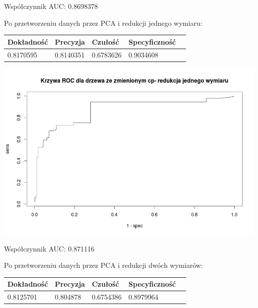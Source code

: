\documentclass{article}
\begin{document}
Współczynnik AUC: 0.8698378

Po przetworzeniu danych przez PCA i redukcji jednego wymiaru:

\begin{center}
    \begin{tabular}{| l | l | l | l | l|}
    \hline
        Dokładność &  Precyzja &  Czułość & Specyficzność \\ \hline
      	0.8170595 & 0.8140351 & 0.6783626 & 0.9034608  \\
    \hline
    \end{tabular}
\end{center}

\begin{center}
	\includegraphics[scale=0.40]{images/cptree1.png}
\end{center}

Współczynnik AUC: 0.871116

Po przetworzeniu danych przez PCA i redukcji dwóch wymiarów:

\begin{center}
    \begin{tabular}{| l | l | l | l | l|}
    \hline
        Dokładność &  Precyzja &  Czułość & Specyficzność \\ \hline
      	0.8125701 & 0.804878 & 0.6754386 & 0.8979964  \\
    \hline
    \end{tabular}
\end{center}
\end{document}
